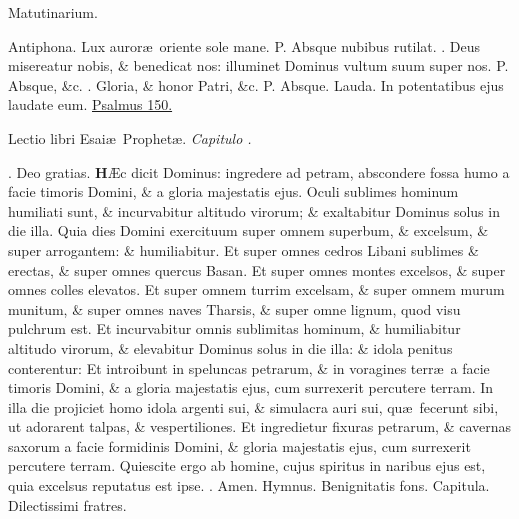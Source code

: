 \documentclass[letter,11pt]{book}
\makeatletter
\DeclareRobustCommand{\Vbar}{\vers@resp{-0.1em}{V}}
\DeclareRobustCommand{\Rbar}{\vers@resp{0pt}{R}}
\newcommand{\vers@resp@sym}{\raisebox{0.2ex}{\rotatebox[origin=c]{-20}{$\m@th\rceil$}}}
\newcommand{\vers@resp}[2]{%
  {\ooalign{\hidewidth\kern#1\vers@resp@sym\hidewidth\cr#2\cr}}%
}%
\def\P{\color{Red} P. \color{black}}
\def\V{\color{Red} \Vbar . \color{black}}
\def\R{\color{Red} \Rbar . \color{black}}
\makeatother
\begin{document}
\begin{multicols*}{2}
\vspace{-.5em} \begin{center} \color{Red} Matutinarium. \color{black} \end{center} \vspace{-.5em}
\par \noindent \color{Red} Antiphona. \color{black} Lux auror\ae \ oriente sole mane. \P Absque nubibus rutilat. \V Deus misereatur nobis, \& benedicat nos: illuminet Dominus vultum suum super nos. \P Absque, \&c. \V Gloria, \& honor Patri, \&c. \P Absque.
\newline \color{Red} Lauda. \color{black} In potentatibus ejus laudate eum. \color{Red} \hyperlink{ps150}{Psalmus 150.} \color{black}
\vspace{-.5em} \begin{center} {\color{Red} L}ectio libri Esai\ae \ Prophet\ae . \itshape Capitulo . \color{black} \end{center} \vspace{-.5em}
\par \noindent \R Deo gratias.
\lettrine[lines=2]{\bfseries \color{Red} H}{}\AE c dicit Dominus: ingredere ad petram, abscondere fossa humo a facie timoris Domini, \& a gloria majestatis ejus. Oculi sublimes hominum humiliati sunt, \& incurvabitur altitudo virorum; \& exaltabitur Dominus solus in die illa. Quia dies Domini exercituum super omnem superbum, \& excelsum, \& super arrogantem: \& humiliabitur. Et super omnes cedros Libani sublimes \& erectas, \& super omnes quercus Basan. Et super omnes montes excelsos, \& super omnes colles elevatos. Et super omnem turrim excelsam, \& super omnem murum munitum, \& super omnes naves Tharsis, \& super omne lignum, quod visu pulchrum est. Et incurvabitur omnis sublimitas hominum, \& humiliabitur altitudo virorum, \& elevabitur Dominus solus in die illa: \& idola penitus conterentur: Et introibunt in speluncas petrarum, \& in voragines terr\ae \ a facie timoris Domini, \& a gloria majestatis ejus, cum surrexerit percutere terram. In illa die projiciet homo idola argenti sui, \& simulacra auri sui, qu\ae \ fecerunt sibi, ut adorarent talpas, \& vespertiliones. Et ingredietur fixuras petrarum, \& cavernas saxorum a facie formidinis Domini, \& gloria majestatis ejus, cum surrexerit percutere terram. Quiescite ergo ab homine, cujus spiritus in naribus ejus est, quia excelsus reputatus est ipse. \R Amen.
\newline \color{Red} Hymnus. \color{black} Benignitatis fons.
\newline \color{Red} Capitula. \color{black} Dilectissimi fratres.

\end{multicols*}
\end{document}
